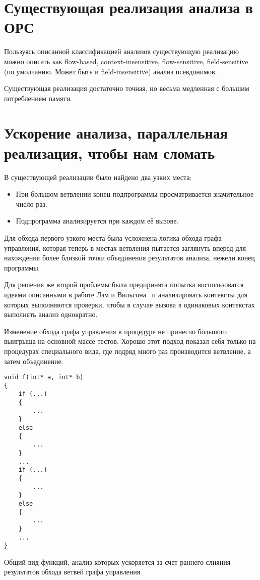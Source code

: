 \section{Существующая реализация анализа в ОРС}

Пользуясь описанной классификацией анализов существующую реализацию можно описать как flow-based, context-insensitive, flow-sensitive, field-sensitive (по умолчанию. Может быть и field-insensitive) анализ псевдонимов.

Существующая реализация достаточно точная, но весьма медленная с большим потреблением памяти.

\section{Ускорение анализа, параллельная реализация, чтобы нам сломать}

В существующей реализации было найдено два узких места:

\begin{itemize}
\item При большом ветвлении конец подпрограммы просматривается значительное число раз.
\item Подпрограмма анализируется при каждом её вызове.
\end{itemize}

Для обхода первого узкого места была усложнена логика обхода графа управления, которая теперь в местах ветвления пытается заглянуть вперед для нахождения более близкой точки объединения результатов анализа, нежели конец программы.

Для решения же второй проблемы была предпринята попытка воспользоватся идеями описанными в работе Лэм и Вильсона~\autocite{WilsonLamSIGPLAN95} и анализировать контексты для которых выполняются проверки, чтобы в случае вызова в одинаковых контекстах выполнять анализ однократно.

\Conc

Изменение обхода графа управления в процедуре не принесло большого выигрыша на основной массе тестов. Хорошо этот подход показал себя только на процедурах специального вида, где подряд много раз производится ветвление, а затем объединение.

\begin{ListingEnv}[H]
\begin{lstlisting}
void f(int* a, int* b)
{
    if (...)
    {
        ...
    }
    else
    {
        ...
    }
    ...
    if (...)
    {
        ...
    }
    else
    {
        ...
    }
    ...
}
\end{lstlisting}
\caption{Общий вид функций, анализ которых ускоряется за счет раннего слияния результатов обхода ветвей графа управления}
\label{list:otherlevels}
\end{ListingEnv}

